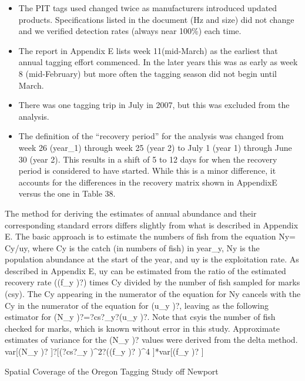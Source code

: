 \documentclass[11pt,
  english,
  letterpaper,
]{article}
\providecommand{\tightlist}{%
  \setlength{\itemsep}{0pt}\setlength{\parskip}{0pt}}
\providecommand{\tightlist}{%
  \setlength{\itemsep}{0pt}\setlength{\parskip}{0pt}}
\begin{document}
\begin{itemize}
\tightlist
\item
  The PIT tags used changed twice as manufacturers introduced updated products. Specifications listed in the document (Hz and size) did not change and we verified detection rates (always near 100\%) each time.
\item
  The report in Appendix E lists week 11(mid-March) as the earliest that annual tagging effort commenced. In the later years this was as early as week 8 (mid-February) but more often the tagging season did not begin until March.
\item
  There was one tagging trip in July in 2007, but this was excluded from the analysis.
\item
  The definition of the ``recovery period'' for the analysis was changed from week 26 (year\_1) through week 25 (year 2) to July 1 (year 1) through June 30 (year 2). This results in a shift of 5 to 12 days for when the recovery period is considered to have started. While this is a minor difference, it accounts for the differences in the recovery matrix shown in AppendixE versus the one in Table 38.
\end{itemize}

The method for deriving the estimates of annual abundance and their corresponding standard errors differs slightly from what is described in Appendix E. The basic approach is to estimate the numbers of fish from the equation Ny= Cy/uy, where Cy is the catch (in numbers of fish) in year\_y, Ny is the population abundance at the start of the year, and uy is the exploitation rate. As described in Appendix E, uy can be estimated from the ratio of the estimated recovery rate ((f\_y )?) times Cy divided by the number of fish sampled for marks (csy). The Cy appearing in the numerator of the equation for Ny cancels with the Cy in the numerator of the equation for (u\_y )?, leaving as the following estimator for (N\_y )?=?cs?\_y?(u\_y )?. Note that csyis the number of fish checked for marks, which is known without error in this study. Approximate estimates of variance for the (N\_y )? values were derived from the delta method. var{[}(N\_y )? {]}?{[}(?cs?\_y )\^{}2?((f\_y )? )\^{}4 {]}*var{[}(f\_y )? {]}

Spatial Coverage of the Oregon Tagging Study off Newport
\end{document}
